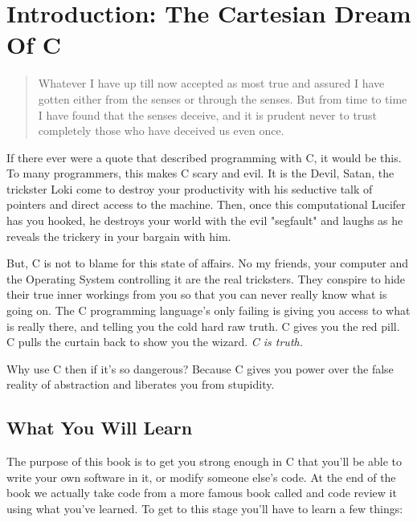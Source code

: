 \chapter*{Introduction: The Cartesian Dream Of C}

\begin{quotation}

Whatever I have up till now accepted as most true and assured I have gotten
either from the senses or through the senses. But from time to time I have
found that the senses deceive, and it is prudent never to trust completely
those who have deceived us even once.

\end{quotation}

If there ever were a quote that described programming with C, it would be this.
To many programmers, this makes C scary and evil.  It is the Devil, Satan, the
trickster Loki come to destroy your productivity with his seductive talk of
pointers and direct access to the machine.  Then, once this computational
Lucifer has you hooked, he destroys your world with the evil "segfault" and
laughs as he reveals the trickery in your bargain with him.

But, C is not to blame for this state of affairs.  No my friends, your computer
and the Operating System controlling it are the real tricksters.  They conspire
to hide their true inner workings from you so that you can never really know
what is going on.  The C programming language's only failing is giving you
access to what is really there, and telling you the cold hard raw truth.  C
gives you the red pill.  C pulls the curtain back to show you the wizard.
\emph{C is truth.}

Why use C then if it's so dangerous?   Because C gives you power over the false
reality of abstraction and liberates you from stupidity.


\section*{What You Will Learn}

The purpose of this book is to get you strong enough in C
that you'll be able to write your own software in it, or modify
someone else's code.  At the end of the book we actually take
code from a more famous book called \krc and code review it
using what you've learned.  To get to this stage you'll have to
learn a few things:

